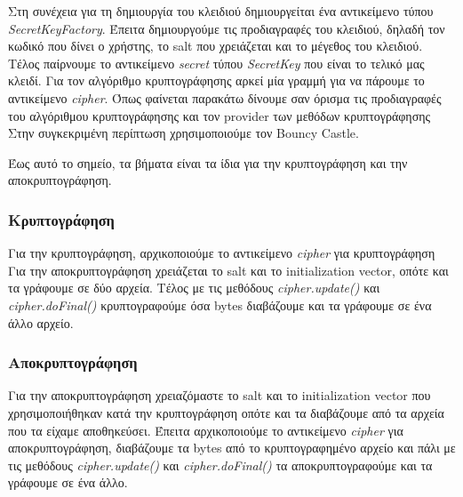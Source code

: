 \documentclass[a4paper]{article}
\begin{document}
Στη συνέχεια για τη δημιουργία του κλειδιού δημιουργείται ένα αντικείμενο τύπου
\emph{SecretKeyFactory}. Έπειτα δημιουργούμε τις προδιαγραφές του κλειδιού, δηλαδή τον
κωδικό που δίνει ο χρήστης, το salt που χρειάζεται και το μέγεθος του κλειδιού.
Τέλος παίρνουμε το αντικείμενο \emph{secret} τύπου \emph{SecretKey} που είναι το
τελικό μας κλειδί. Για τον αλγόριθμο κρυπτογράφησης αρκεί μία γραμμή για να
πάρουμε το αντικείμενο \emph{cipher}. Όπως φαίνεται παρακάτω δίνουμε σαν όρισμα
τις προδιαγραφές του αλγόριθμου κρυπτογράφησης και τον provider των μεθόδων
κρυπτογράφησης Στην συγκεκριμένη περίπτωση χρησιμοποιούμε τον Bouncy Castle. 
\lstset{language=Java, numbers=left}


Έως αυτό το σημείο, τα βήματα είναι τα ίδια για την κρυπτογράφηση και την
αποκρυπτογράφηση.

\subsubsection{Κρυπτογράφηση}
Για την κρυπτογράφηση, αρχικοποιούμε το αντικείμενο \emph{cipher} για
κρυπτογράφηση Για την αποκρυπτογράφηση χρειάζεται το salt και το initialization
vector, οπότε και τα γράφουμε σε δύο αρχεία. Τέλος με τις μεθόδους
\emph{cipher.update()} και \emph{cipher.doFinal()} κρυπτογραφούμε όσα bytes
διαβάζουμε και τα γράφουμε σε ένα άλλο αρχείο.
\lstset{language=Java, numbers=left}


\subsubsection{Αποκρυπτογράφηση}
Για την αποκρυπτογράφηση χρειαζόμαστε το salt και το initialization vector που
χρησιμοποιήθηκαν κατά την κρυπτογράφηση οπότε και τα διαβάζουμε από τα αρχεία
που τα είχαμε αποθηκεύσει. Έπειτα αρχικοποιούμε το αντικείμενο \emph{cipher} για
αποκρυπτογράφηση, διαβάζουμε τα bytes από το κρυπτογραφημένο αρχείο και πάλι με
τις μεθόδους \emph{cipher.update()} και \emph{cipher.doFinal()} τα
αποκρυπτογραφούμε και τα γράφουμε σε ένα άλλο.
\lstset{language=Java, numbers=left}

\end{document}
